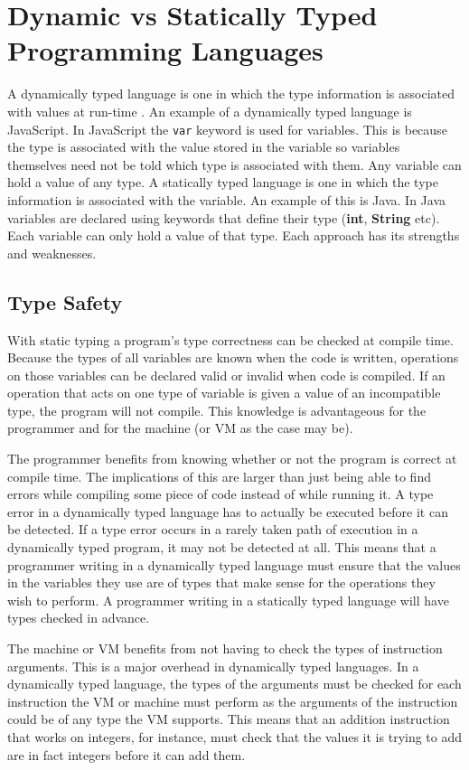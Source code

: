 \documentclass[english,a4paper,12pt]{report}
\begin{document}
\section{Dynamic vs Statically Typed Programming Languages}
\label{sec:dyn-static-langs}

A dynamically typed language is one in which the type information is
associated with values at run-time
\cite[pg4]{RobertoIerusalimschy}. An example of a dynamically typed
language is JavaScript. In JavaScript the \verb|var| keyword is used
for variables. This is because the type is associated with the value
stored in the variable so variables themselves need not be told which
type is associated with them. Any variable can hold a value of any
type. A statically typed language is one in which the type information
is associated with the variable. An example of this is Java. In Java
variables are declared using keywords that define their type
(\textbf{int}, \textbf{String} etc). Each variable can only hold a
value of that type. Each approach has its strengths and weaknesses.

\subsection{Type Safety}
\label{sec:type_safe}
With static typing a program's type correctness can be checked at
compile time. Because the types of all variables are known when the
code is written, operations on those variables can be declared valid
or invalid when code is compiled. If an operation that acts on one
type of variable is given a value of an incompatible type, the program
will not compile. This knowledge is advantageous for the programmer
and for the machine (or VM as the case may be).

The programmer benefits from knowing whether or not the program is
correct at compile time. The implications of this are larger than just
being able to find errors while compiling some piece of code instead
of while running it. A type error in a dynamically typed language has
to actually be executed before it can be detected. If a type error
occurs in a rarely taken path of execution in a dynamically typed
program, it may not be detected at all. This means that a programmer
writing in a dynamically typed language must ensure that the values in
the variables they use are of types that make sense for the operations
they wish to perform. A programmer writing in a statically typed
language will have types checked in advance.

The machine or VM benefits from not having to check the types of
instruction arguments. This is a major overhead in dynamically typed
languages. In a dynamically typed language, the types of the arguments
must be checked for each instruction the VM or machine must perform as
the arguments of the instruction could be of any type the VM
supports. This means that an addition instruction that works on
integers, for instance, must check that the values it is trying to add
are in fact integers before it can add them.
\end{document}
